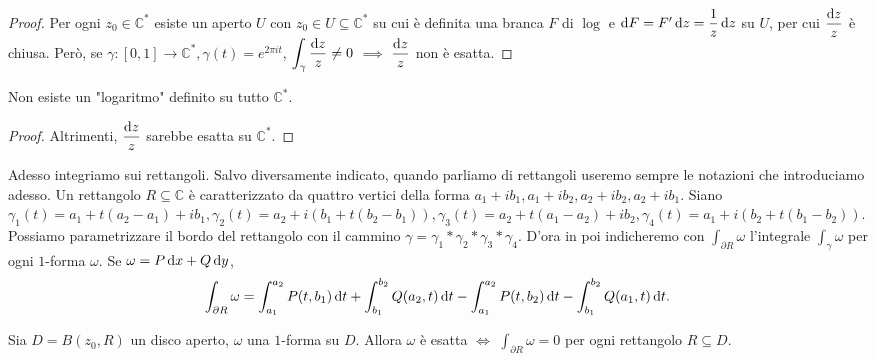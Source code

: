 \begin{proof}
  Per ogni $z_0 \in \mathbb{C}^*$ esiste un aperto $U$ con $z_0 \in U \subseteq \mathbb{C}^*$ su cui è definita una branca $F$ di $\log$ e $\mathop{}\!\mathrm{d} F=F'\mathop{}\!\mathrm{d} z=\dfrac{1}{z}\mathop{}\!\mathrm{d} z$ su $U$, per cui $\dfrac{\mathop{}\!\mathrm{d} z}{z}$ è chiusa.
  Però, se $\gamma:[0,1] \longrightarrow \mathbb{C}^*, \gamma(t)=e^{2\pi it}$, $\displaystyle \int_{\gamma} \frac{\mathop{}\!\mathrm{d} z}{z}\not=0$ $\implies$ $\dfrac{\mathop{}\!\mathrm{d} z}{z}$ non è esatta.
\end{proof}

\begin{cor}
  Non esiste un "logaritmo" definito su tutto $\mathbb{C}^*$.
\end{cor}

\begin{proof}
  Altrimenti, $\dfrac{\mathop{}\!\mathrm{d} z}{z}$ sarebbe esatta su $\mathbb{C}^*$.
\end{proof}

Adesso integriamo sui rettangoli. Salvo diversamente indicato, quando parliamo di rettangoli useremo sempre le notazioni che introduciamo adesso. Un rettangolo $R \subseteq \mathbb{C}$ è caratterizzato da quattro vertici della forma $a_1+ib_1, a_1+ib_2, a_2+ib_2, a_2+ib_1$. Siano $\gamma_1(t)=a_1+t(a_2-a_1)+ib_1, \gamma_2(t)=a_2+i(b_1+t(b_2-b_1)), \gamma_3(t)=a_2+t(a_1-a_2)+ib_2, \gamma_4(t)=a_1+i(b_2+t(b_1-b_2))$.
Possiamo parametrizzare il bordo del rettangolo con il cammino $\gamma=\gamma_1*\gamma_2*\gamma_3*\gamma_4$. D'ora in poi indicheremo con $\displaystyle \int_{\partial R} \omega$ l'integrale $\displaystyle \int_{\gamma} \omega$ per  ogni $1$-forma $\omega$. Se $\omega=P\mathop{}\!\mathrm{d} x+Q\mathop{}\!\mathrm{d} y$,
$$\int_{\partial R} \omega=\int_{a_1}^{a_2}P(t, b_1)\mathop{}\!\mathrm{d} t+\int_{b_1}^{b_2}Q(a_2, t)\mathop{}\!\mathrm{d} t-\int_{a_1}^{a_2}P(t, b_2)\mathop{}\!\mathrm{d} t-\int_{b_1}^{b_2}Q(a_1, t)\mathop{}\!\mathrm{d} t.$$

\begin{prop} \label{int=0no2}
  Sia $D=B(z_0, R)$ un disco aperto, $\omega$ una $1$-forma su $D$. Allora $\omega$ è esatta $\iff$ $\displaystyle \int_{\partial R} \omega=0$ per ogni rettangolo $R \subseteq D$.
\end{prop}

